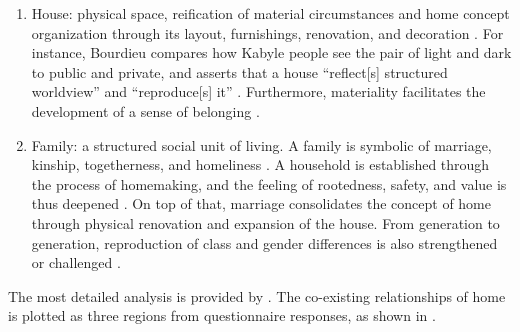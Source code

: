 \begin{enumerate}
    \item House: physical space, reification of material circumstances and home concept organization through its layout, furnishings, renovation, and decoration \parencite{samanani2019house}. For instance, Bourdieu compares how Kabyle people see the pair of light and dark to public and private, and asserts that a house ``reflect[s] structured worldview'' and ``reproduce[s] it'' \parencite{samanani2019house}. Furthermore, materiality facilitates the development of a sense of belonging \parencite{moore2000placing}.
    \item Family: a structured social unit of living. A family is symbolic of marriage, kinship, togetherness, and homeliness \parencite{samanani2019house}. A household is established through the process of homemaking, and the feeling of rootedness, safety, and value is thus deepened \parencite{samanani2019house,moore2000placing}. On top of that, marriage consolidates the concept of home through physical renovation and expansion of the house. From generation to generation, reproduction of class and gender differences is also strengthened or challenged \parencite{samanani2019house,mallett2004understanding}.
\end{enumerate}

The most detailed analysis is provided by \textcite{sixsmith1986meaning}. The co-existing relationships of home is plotted as three regions from questionnaire responses, as shown in  \parencite{sixsmith1986meaning}.

